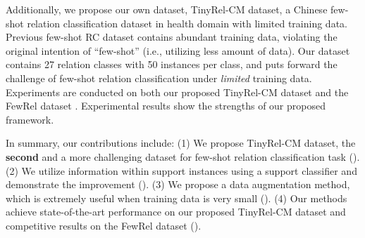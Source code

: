 Additionally, we propose our own dataset, TinyRel-CM dataset, a Chinese few-shot relation classification dataset in health domain with limited training data.
Previous few-shot RC dataset contains abundant training data, violating the original intention of ``few-shot'' (i.e., utilizing less amount of data).
Our dataset contains 27 relation classes with 50 instances per class, and puts forward the challenge of few-shot relation classification under \emph{limited} training data. Experiments are conducted on both our proposed TinyRel-CM dataset and the FewRel dataset \cite{han-etal-2018-fewrel}. Experimental results show the strengths of our proposed framework.


In summary, our contributions include:
 (1) We propose TinyRel-CM dataset,
the {\bf second} and a more challenging dataset for few-shot relation classification task ().
(2) We utilize information within support instances using a support classifier and demonstrate the improvement ().
(3) We propose a data augmentation method, which is extremely useful when training data is very small ().
(4) Our methods achieve state-of-the-art performance on our proposed TinyRel-CM dataset and competitive results on the FewRel dataset ().

